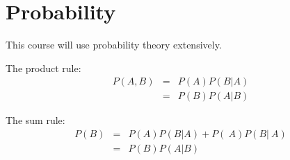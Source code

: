 \chapter{Probability}
This course will use probability theory extensively.

The product rule:
\begin{eqnarray}
P(A, B) &=& P(A)P(B|A) \\
&=& P(B)P(A|B)
\end{eqnarray}

The sum rule:
\begin{eqnarray}
P(B) &=& P(A)P(B|A) + P(~A)P(B|~A) \\
&=& P(B)P(A|B)
\end{eqnarray}

